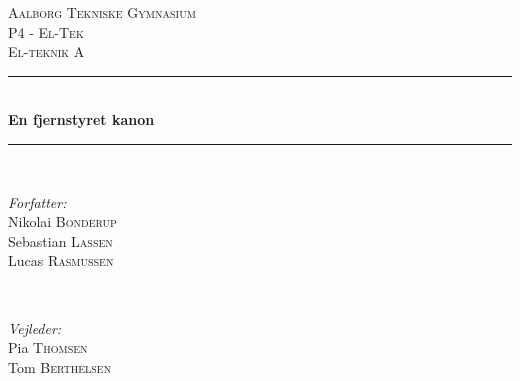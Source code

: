 


\begin{titlepage}

\newcommand{\HRule}{\rule{\linewidth}{0.5mm}} %

\center %
 

\textsc{\LARGE Aalborg Tekniske Gymnasium}\\[1.5cm] %
\textsc{\Large P4 - El-Tek}\\[0.5cm] %
\textsc{\large El-teknik A}\\[0.5cm] %


\HRule \\[0.4cm]
{ \huge \bfseries En fjernstyret kanon  }\\[0.4cm] %
\HRule \\[1.5cm]
 

\begin{minipage}{0.4\textwidth}
\begin{flushleft} \large
\emph{Forfatter:}\\
Nikolai \textsc{Bonderup}\\ %
Sebastian \textsc{Lassen}\\
Lucas \textsc{Rasmussen}
\end{flushleft}
\end{minipage}
~
\begin{minipage}{0.4\textwidth}
\begin{flushright} \large
\emph{Vejleder:} \\
Pia \textsc{Thomsen} \\ %
Tom \textsc{Berthelsen}\\
\end{flushright}
\end{minipage}\\[2cm]


\end{titlepage}
